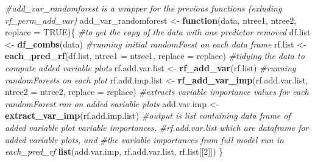 \documentclass[12pt,twoside]{reedthesis}
\newenvironment{Shaded}{\begin{snugshade}}{\end{snugshade}}
\newcommand{\KeywordTok}[1]{\textcolor[rgb]{0.13,0.29,0.53}{\textbf{#1}}}
\newcommand{\DataTypeTok}[1]{\textcolor[rgb]{0.13,0.29,0.53}{#1}}
\newcommand{\DecValTok}[1]{\textcolor[rgb]{0.00,0.00,0.81}{#1}}
\newcommand{\StringTok}[1]{\textcolor[rgb]{0.31,0.60,0.02}{#1}}
\newcommand{\CommentTok}[1]{\textcolor[rgb]{0.56,0.35,0.01}{\textit{#1}}}
\newcommand{\OtherTok}[1]{\textcolor[rgb]{0.56,0.35,0.01}{#1}}
\newcommand{\ControlFlowTok}[1]{\textcolor[rgb]{0.13,0.29,0.53}{\textbf{#1}}}
\newcommand{\NormalTok}[1]{#1}
\theoremstyle{definition}
\theoremstyle{definition}
\theoremstyle{definition}
\theoremstyle{remark}
\begin{document}
\begin{Shaded}
\begin{Highlighting}[]
{\CommentTok{#add_var_randomforest is a wrapper for the previous functions (exluding rf_perm_add_var)}
\NormalTok{add_var_randomforest <-}\StringTok{ }\ControlFlowTok{function}\NormalTok{(data, ntree1, ntree2, }\DataTypeTok{replace =} \OtherTok{TRUE}\NormalTok{)\{}
  \CommentTok{#to get the copy of the data with one predictor removed}
\NormalTok{  df.list <-}\StringTok{ }\KeywordTok{df_combs}\NormalTok{(data)}
  \CommentTok{#running initial randomFoest on each data frame}
\NormalTok{  rf.list <-}\StringTok{ }\KeywordTok{each_pred_rf}\NormalTok{(df.list, }\DataTypeTok{ntree1 =}\NormalTok{ ntree1, }\DataTypeTok{replace =}\NormalTok{ replace)}
  \CommentTok{#tidying the data to compute added variable plots}
\NormalTok{  rf.add.var.list <-}\StringTok{ }\KeywordTok{rf_add_var}\NormalTok{(rf.list)}
  \CommentTok{#running randomForests on each plot}
\NormalTok{  rf.add.imp.list <-}\StringTok{ }\KeywordTok{rf_add_var_imp}\NormalTok{(rf.add.var.list, }\DataTypeTok{ntree2 =}\NormalTok{ ntree2, }\DataTypeTok{replace =}\NormalTok{ replace)}
  \CommentTok{#extracts variable importance values for each randomForest ran on added variable plots}
\NormalTok{  add.var.imp <-}\StringTok{ }\KeywordTok{extract_var_imp}\NormalTok{(rf.add.imp.list)}
  \CommentTok{#output is list containing data frame of added variable plot variable importances, }
  \CommentTok{#rf.add.var.list which are dataframe for added variable plots, and }
  \CommentTok{#the variable importances from full model run in each_pred_rf}
  \KeywordTok{list}\NormalTok{(add.var.imp, rf.add.var.list, rf.list[[}\DecValTok{2}\NormalTok{]])}
\NormalTok{\}}

}
\end{Highlighting}
\end{Shaded}
\end{document}

